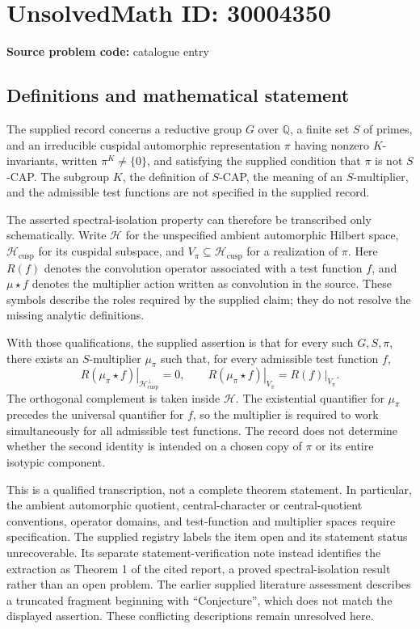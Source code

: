 \documentclass[11pt]{article}
\newcommand{\Q}{\mathbb{Q}}
\begin{document}
\section*{UnsolvedMath ID: 30004350}
\textbf{Source problem code:} catalogue entry
\subsection{Definitions and mathematical statement}
The supplied record concerns a reductive group \(G\) over \(\Q\), a finite set \(S\) of primes, and an irreducible cuspidal automorphic representation \(\pi\) having nonzero \(K\)-invariants, written \(\pi^K\ne\{0\}\), and satisfying the supplied condition that \(\pi\) is not \(S\)-CAP. The subgroup \(K\), the definition of \(S\)-CAP, the meaning of an \(S\)-multiplier, and the admissible test functions are not specified in the supplied record.

The asserted spectral-isolation property can therefore be transcribed only schematically. Write \(\mathcal H\) for the unspecified ambient automorphic Hilbert space, \(\mathcal H_{\mathrm{cusp}}\) for its cuspidal subspace, and \(V_\pi\subseteq\mathcal H_{\mathrm{cusp}}\) for a realization of \(\pi\). Here \(R(f)\) denotes the convolution operator associated with a test function \(f\), and \(\mu\star f\) denotes the multiplier action written as convolution in the source. These symbols describe the roles required by the supplied claim; they do not resolve the missing analytic definitions.

With those qualifications, the supplied assertion is that for every such \(G,S,\pi\), there exists an \(S\)-multiplier \(\mu_\pi\) such that, for every admissible test function \(f\),
\[
\left.R(\mu_\pi\star f)\right|_{\mathcal H_{\mathrm{cusp}}^{\perp}}=0,
\qquad
\left.R(\mu_\pi\star f)\right|_{V_\pi}
=
\left.R(f)\right|_{V_\pi}.
\]
The orthogonal complement is taken inside \(\mathcal H\). The existential quantifier for \(\mu_\pi\) precedes the universal quantifier for \(f\), so the multiplier is required to work simultaneously for all admissible test functions. The record does not determine whether the second identity is intended on a chosen copy of \(\pi\) or its entire isotypic component.

This is a qualified transcription, not a complete theorem statement. In particular, the ambient automorphic quotient, central-character or central-quotient conventions, operator domains, and test-function and multiplier spaces require specification. The supplied registry labels the item open and its statement status unrecoverable. Its separate statement-verification note instead identifies the extraction as Theorem 1 of the cited report, a proved spectral-isolation result rather than an open problem. The earlier supplied literature assessment describes a truncated fragment beginning with ``Conjecture'', which does not match the displayed assertion. These conflicting descriptions remain unresolved here.
\end{document}
